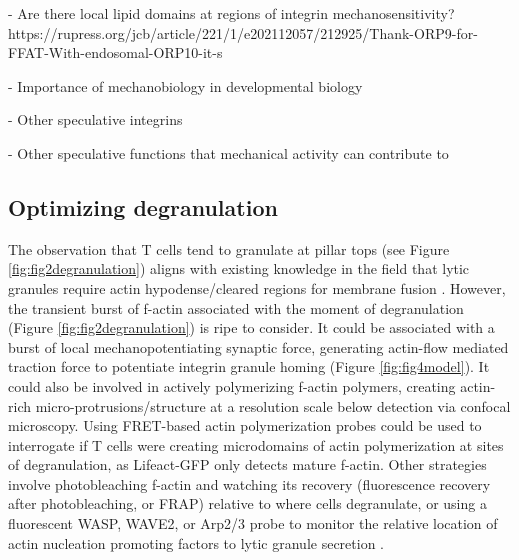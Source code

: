 - Are there local lipid domains at regions of integrin mechanosensitivity? https://rupress.org/jcb/article/221/1/e202112057/212925/Thank-ORP9-for-FFAT-With-endosomal-ORP10-it-s

- Importance of mechanobiology in developmental biology

- Other speculative integrins

- Other speculative functions that mechanical activity can contribute to

\subsection{Optimizing degranulation}
The observation that T cells tend to granulate at pillar tops (see Figure \ref{fig:fig2degranulation}) aligns with existing knowledge in the field that lytic granules require actin hypodense/cleared regions for membrane fusion \cite{Ritter2015}.  However, the transient burst of f-actin associated with the moment of degranulation (Figure \ref{fig:fig2degranulation}) is ripe to consider.  It could be associated with a burst of local mechanopotentiating synaptic force,  generating actin-flow mediated traction force to potentiate integrin granule homing (Figure \ref{fig:fig4model}). It could also be involved in actively polymerizing f-actin polymers, creating actin-rich micro-protrusions/structure at a resolution scale below detection via confocal microscopy.  Using FRET-based actin polymerization probes could be used to interrogate if T cells were creating microdomains of actin polymerization at sites of degranulation,  as Lifeact-GFP only detects mature f-actin.  Other strategies involve photobleaching f-actin and watching its recovery (fluorescence recovery after photobleaching, or FRAP) \cite{Simon1988} relative to where cells degranulate, or using a fluorescent WASP, WAVE2, or Arp2/3 probe to monitor the relative location of actin nucleation promoting factors to lytic granule secretion \cite{Obino2016, Tamzalit2018}. 

